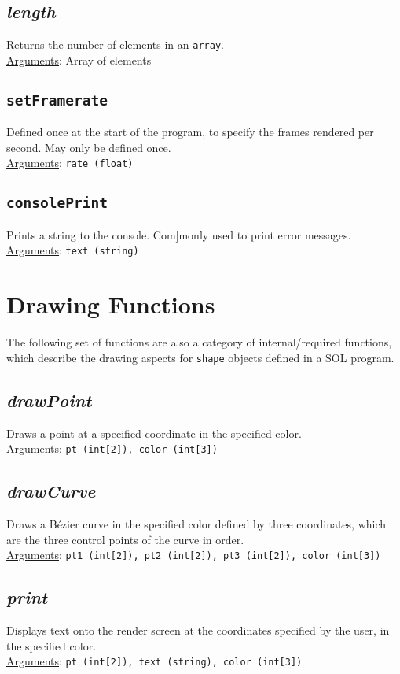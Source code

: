 \documentclass[letterpaper,12pt]{article}
\begin{document}
    \subsection{\textit{length}}
    Returns the number of elements in an \texttt{array}.\\
    \underline{Arguments}: Array of elements
    
    \subsection{\texttt{setFramerate}}
    Defined once at the start of the program, to specify the frames rendered per second. May only be defined once.\\
    \underline{Arguments}: \texttt{rate (float)}
    
    \subsection{\texttt{consolePrint}}
    Prints a string to the console. Com]monly used to print error messages.\\
\underline{Arguments}: \texttt{text (string)}


\section{Drawing Functions}
The following set of functions are also a category of internal/required functions, which describe the drawing aspects for \texttt{shape} objects defined in a SOL program.

\subsection{\textit{drawPoint}}
Draws a point at a specified coordinate in the specified color.\\
\underline{Arguments}: \texttt{pt (int[2]), color (int[3])}

\subsection{\textit{drawCurve}}
Draws a B\'ezier curve in the specified color defined by three coordinates, which are the three control points of the curve in order.\\
\underline{Arguments}: \texttt{pt1 (int[2]), pt2 (int[2]), pt3 (int[2]), color (int[3])}

\subsection{\textit{print}}
Displays text onto the render screen at the coordinates specified by the user, in the specified color.\\
\underline{Arguments}: \texttt{pt (int[2]), text (string), color (int[3])}
\end{document}
